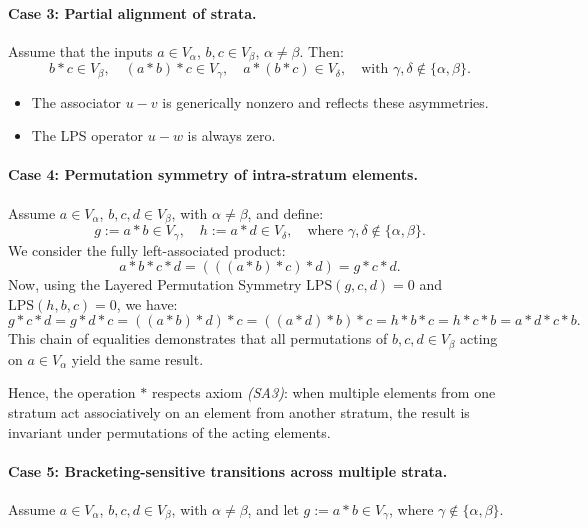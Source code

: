 \documentclass[12pt]{article}
\theoremstyle{definition}
\theoremstyle{plain}
\theoremstyle{remark}
\begin{document}
\paragraph{Case 3: Partial alignment of strata.}

Assume that the inputs \( a \in V_\alpha \), \( b, c \in V_\beta \), \( \alpha \ne \beta \). Then:
\[
b * c \in V_\beta, \quad (a * b) * c \in V_\gamma, \quad a * (b * c) \in V_\delta, \quad \text{with } \gamma, \delta \notin \{ \alpha, \beta \}.
\]
\begin{itemize}
    \item The associator \( u - v \) is generically nonzero and reflects these asymmetries.
    \item The LPS operator \( u - w \) is always zero.
\end{itemize}

\paragraph{Case 4: Permutation symmetry of intra-stratum elements.}

Assume \( a \in V_\alpha \), \( b, c, d \in V_\beta \), with \( \alpha \ne \beta \), and define:
\[
g := a * b \in V_\gamma, \quad h := a * d \in V_\delta, \quad \text{where } \gamma, \delta \notin \{\alpha, \beta\}.
\]
We consider the fully left-associated product:
\[
a * b * c * d = (((a * b) * c) * d) = g * c * d.
\]
Now, using the Layered Permutation Symmetry \( \mathrm{LPS}(g, c, d) = 0 \) and \( \mathrm{LPS}(h, b, c) = 0 \), we have:
\[
g * c * d = g * d * c = ((a * b) * d) * c = ((a * d) * b) * c = h * b * c = h * c * b = a * d * c * b.
\]
This chain of equalities demonstrates that all permutations of \( b, c, d \in V_\beta \) acting on \( a \in V_\alpha \) yield the same result.

Hence, the operation \( * \) respects axiom \emph{(SA3)}: when multiple elements from one stratum act associatively on an element from another stratum, the result is invariant under permutations of the acting elements.

\paragraph{Case 5: Bracketing-sensitive transitions across multiple strata.}

Assume \( a \in V_\alpha \), \( b, c, d \in V_\beta \), with \( \alpha \ne \beta \), and let \( g := a * b \in V_\gamma \), where \( \gamma \notin \{\alpha, \beta\} \).
\end{document}
